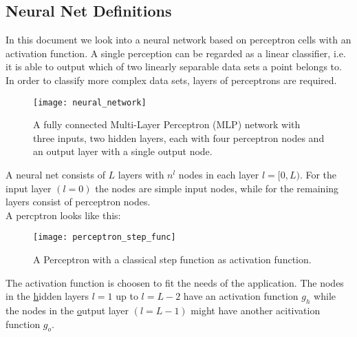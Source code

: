 \subsection{Neural Net Definitions}

In this document we look into a neural network based on perceptron cells with an
activation function. A single perception can be regarded as a linear classifier, i.e. it
is able to output which of two linearly separable data sets a point belongs to. In order
to classify more complex data sets, layers of perceptrons are required.

\begin{figure}[h] \centering
    \texttt{[image: neural\_network]} \caption{A fully
    connected Multi-Layer Perceptron (MLP) network with three inputs, two
    hidden layers, each with four perceptron nodes and an output layer with a
    single output node.} \label{fig:neural_network}
\end{figure}

A neural net consists of $L$ layers with $n^l$ nodes in each layer $l=[0,L)$. For the
input layer $(l=0)$ the nodes are simple input nodes, while for the remaining layers
consist of perceptron nodes. \\

A percptron looks like this:
\begin{figure}[h] \centering \texttt{[image: perceptron\_step\_func]}
    \caption{A Perceptron with a classical step function as activation function.}
    \label{fig:percptron_step_func}
\end{figure}

The activation function is choosen to fit the needs of the application. The nodes in the
\underline{h}idden layers $l=1$ up to $l=L-2$ have an activation function $g_h$ while the
nodes in the \underline{o}utput layer $(l=L-1)$ might have another acitivation function
$g_o$. \\

